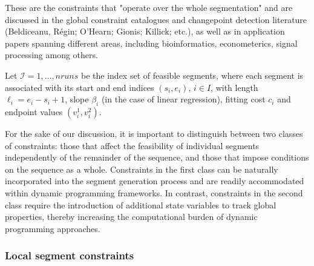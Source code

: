 \documentclass[preprints,article,submit,pdftex,moreauthors]{Definitions/mdpi}
\begin{document}
These are the constraints that "operate over the whole segmentation" and are discussed in the global constraint catalogues and changepoint detection literature (Beldiceanu, Régin; O'Hearn; Gionis; Killick; etc.), as well as in application papers spanning different areas, including bioinformatics, econometerics, signal processing among others. 

Let $\mathcal{I} = {1, \ldots, nruns}$ be the index set of feasible segments, where each segment is associated with its start and end indices $(s_i,e_i)$, $i \in I$, with length $\ell_i = e_i - s_i + 1$, slope $\beta_i$ (in the case of linear regression), fitting cost $c_i$ and endpoint values $(v^1_i,v^2_i)$. 

For the sake of our discussion, it is important to distinguish between two classes of constraints: those that affect the feasibility of individual segments independently of the remainder of the sequence, and those that impose conditions on the sequence as a whole. Constraints in the first class can be naturally incorporated into the segment generation process and are readily accommodated within dynamic programming frameworks. In contrast, constraints in the second class require the introduction of additional state variables to track global properties, thereby increasing the computational burden of dynamic programming approaches.

\subsubsection{Local segment constraints} \label{subsubsec:segment_level_constraint}
\end{document}
